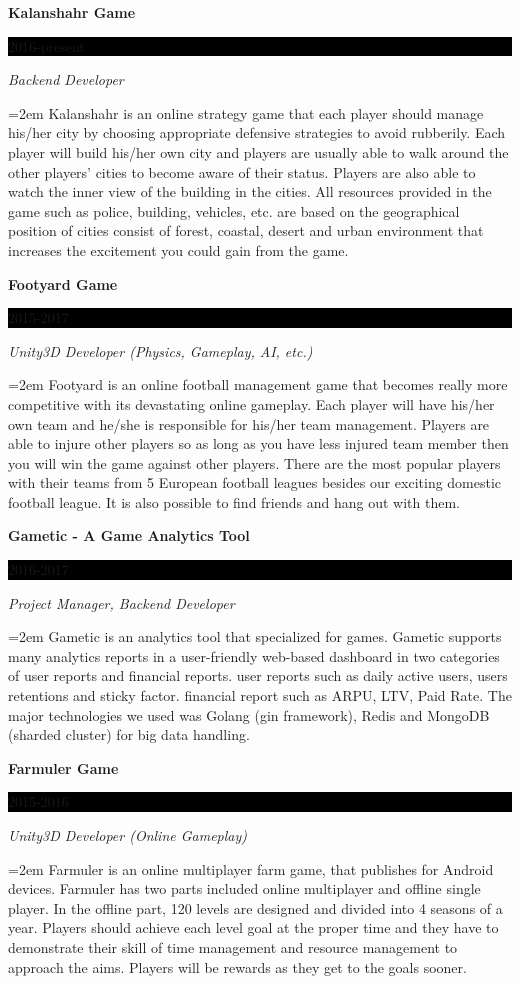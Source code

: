 \documentclass[paper=a4,fontsize=11pt]{scrartcl} %
\newcommand{\sepspace}{\vspace*{1em}}        %
\newcommand{\EducationEntry}[4]{
        \noindent \textbf{#1} \hfill      %
        \colorbox{Black}{%
            \parbox{6em}{%
            \hfill\color{White}#2}} \par  %
        \noindent \textit{#3} \par        %
        \noindent\hangindent=2em\hangafter=0 \small #4 %
        \normalsize \par}
\newcommand{\ExperienceEntry}[4]{         %
        \noindent \textbf{#1} \hfill      %
        \colorbox{Black}{%
            \parbox{6em}{%
            \hfill\color{White}#2}} \par      %
        \noindent \textit{#3} \par        %
        \noindent\hangindent=2em\hangafter=0 \small #4 %
        \normalsize \par}
\begin{document}
\ExperienceEntry{Kalanshahr Game}{2016-present}{Backend Developer}{Kalanshahr is an online strategy game that each player should manage his/her city by choosing appropriate defensive strategies to avoid rubberily. Each player will build his/her own city and players are usually able to walk around the other players' cities to become aware of their status. Players are also able to watch the inner view of the building in the cities. All resources provided in the game such as police, building, vehicles, etc. are based on the geographical position of cities consist of forest, coastal, desert and urban environment that increases the excitement you could gain from the game.}
\sepspace


\ExperienceEntry{Footyard Game}{2015-2017}{Unity3D Developer (Physics, Gameplay, AI, etc.)}{Footyard is an online football management game that becomes really more competitive with its devastating online gameplay. Each player will have his/her own team and he/she is responsible for his/her team management. Players are able to injure other players so as long as you have less injured team member then you will win the game against other players. There are the most popular players with their teams from 5 European football leagues besides our exciting domestic football league. It is also possible to find friends and hang out with them.}
\sepspace

\ExperienceEntry{Gametic - A Game Analytics Tool}{2016-2017}{Project Manager, Backend Developer}{Gametic is an analytics tool that specialized for games. Gametic supports many analytics reports in a user-friendly web-based dashboard in two categories of user reports and financial reports. user reports such as daily active users, users retentions and sticky factor. financial report such as ARPU, LTV, Paid Rate.
The major technologies we used was Golang (gin framework), Redis and MongoDB (sharded cluster) for big data handling.}
\sepspace

\ExperienceEntry{Farmuler Game}{2015-2016}{Unity3D Developer (Online Gameplay)}{Farmuler is an online multiplayer farm game, that publishes for Android devices. Farmuler has two parts included online multiplayer and offline single player. In the offline part, 120 levels are designed and divided into 4 seasons of a year. Players should achieve each level goal at the proper time and they have to demonstrate their skill of time management and resource management to approach the aims. Players will be rewards as they get to the goals sooner.}
\sepspace
\end{document}

